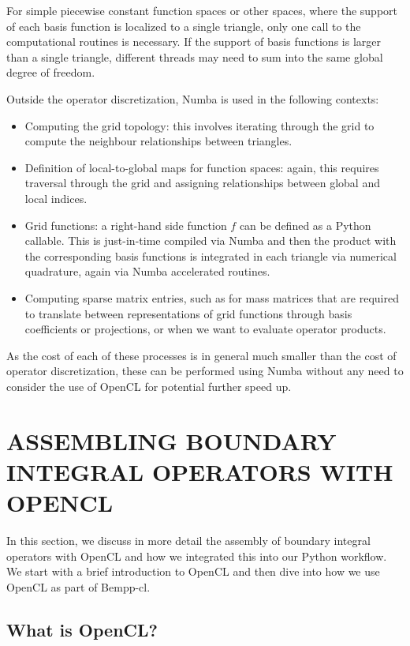 \documentclass{IEEEcsmag}
\begin{document}
For simple piecewise constant function spaces or other spaces, where the support of each basis function is localized to a single triangle, only one call to the computational routines is necessary. If the support of basis functions is larger than a single triangle, different threads may need to sum into the same global degree of freedom.

Outside the operator discretization, Numba is used in the following contexts:
\begin{itemize}
	\item Computing the grid topology: this involves iterating through the grid to compute the neighbour relationships between triangles.
	\item Definition of local-to-global maps for function spaces: again, this requires traversal through the grid and assigning relationships between global and local indices.
	\item Grid functions: a right-hand side function $f$ can be defined as a Python callable. This is just-in-time compiled via Numba and then the product with the corresponding basis functions is integrated in each triangle via numerical quadrature, again via Numba accelerated routines.
	\item Computing sparse matrix entries, such as for mass matrices that are required to translate between representations of grid functions through basis coefficients or projections, or when we want to evaluate operator products.
\end{itemize}

As the cost of each of these processes is in general much smaller than the cost of operator discretization, these can be performed using Numba without any need to consider the use of OpenCL for potential further speed up.


\section{ASSEMBLING BOUNDARY INTEGRAL OPERATORS WITH OPENCL}

In this section, we discuss in more detail the assembly of boundary integral operators with OpenCL
and how we integrated this into our Python workflow. We start with a brief introduction to OpenCL and then
dive into how we use OpenCL as part of Bempp-cl.

\subsection{What is OpenCL?}
\end{document}
